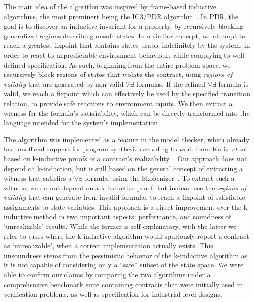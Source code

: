 The main idea of the algorithm was inspired by frame-based inductive algorithms, the most prominent being the IC3/PDR algorithm~\cite{bradley2011sat,een2011efficient}. In PDR, the goal is to discover an inductive invariant for a property, by recursively blocking generalized regions describing unsafe states. In a similar concept, we attempt
to reach a greatest fixpoint that contains states usable indefinitely by the
system, in order to react to unpredictable environment behaviour, while
complying to well-defined specification. As such, beginning from the entire
problem space, we recursively block regions of states that violate the contract, using \textit{regions of validity} that are
generated by non-valid $\forall\exists$-formulas. If the refined
$\forall\exists$-formula is valid, we reach a fixpoint which can effectively be used by the specified transition relation, to
provide safe reactions to environment inputs. We then extract a witness for the
formula's satisfiability, which can be directly transformed into the
language intended for the system's implementation.

The algorithm was implemented as a feature in the \jkind model checker, which
already had unofficial support for program synthesis according to work from
Katis~\textit{et al.} based on k-inductive proofs of a contract's
realizability~\cite{gacek2015towards,katis2016towards,katis2016synthesis}.
Our approach does not depend on k-induction, but is still based on the general
concept of extracting a witness that satisfies a $\forall\exists$-formula, using
the \aeval Skolemizer~\cite{fedyukovich2015automated}. To extract such a witness, we do not depend on a k-inductive proof, but instead use the \textit{regions of validity} that \aeval can generate from invalid formulas
to reach a fixpoint of satisfiable assignments to state variables.
This approach is a direct improvement over the k-inductive method in two
important aspects: performance, and soundness of `unrealizable' results. While
the former is self-explanatory, with the latter we refer to cases where the
k-inductive algorithm would spuriously report a contract as `unrealizable', when a correct
implementation actually exists. This unsoundness stems from the pessimistic
behavior of the k-inductive algorithm as it is not capable of
considering only a ``safe'' subset of the state space. We were able to confirm our claims
by comparing the two algorithms under a comprehensive benchmark suite containing
contracts that were initially used in verification problems, as well as
specification for industrial-level designs.

